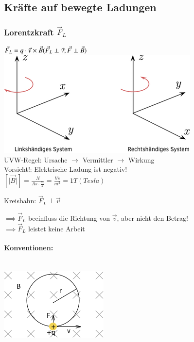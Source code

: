   \subsection{ Kräfte auf bewegte Ladungen }  
    \subsubsection{ Lorentzkraft $\vec{F}_L$ }
    $\vec{F}_L = q\cdot\vec{v}\times\vec{B}\\ (\vec{F}_L \perp \vec{v}; \vec{F}\perp \vec{B} ) $\\
    
    \includegraphics{skizzen/16/16_1B01}\\
    
    UVW-Regel: Ursache $\rightarrow$ Vermittler $\rightarrow$ Wirkung\\
    Vorsicht!: Elektrische Ladung ist negativ!\\
    
    $[\vert\vec{B}\vert]=\frac{N}{As\cdot\frac{m}{s}}=\frac{Vs}{m^2}=1T (Tesla)$
    
    Kreisbahn: $\vec{F}_L\perp \vec{v}$
    
    $\implies \vec{F}_L$ beeinfluss die Richtung von $\vec{v}$, aber nicht den Betrag!\\
    $\implies \vec{F}_L$ leistet keine Arbeit
    
      \paragraph{Konventionen:}\leavevmode \\
      
      \includegraphics{skizzen/16/16_1B02}\\
      
